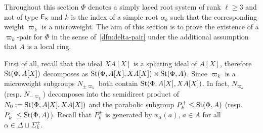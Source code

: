 Throughout this section $\Phi$ denotes a simply laced root system of rank $\ell \geq 3$ and not of type $\mathsf{E}_8$ and $k$ is the index of
 a simple root $\alpha_k$ such that the corresponding weight $\varpi_k$ is a microweight.
The aim of this section is to prove the existence of a $\varpi_k$-pair for $\Phi$ in the sense of~\cref{dfn:delta-pair}
 under the additional assumption that $A$ is a local ring.

First of all, recall that the ideal $XA[X]$ is a splitting ideal of $A[X]$, therefore
$\operatorname{St}(\Phi, A[X])$ decomposes as $\operatorname{St}(\Phi, A[X], XA[X]) \rtimes \operatorname{St}(\Phi, A)$.
Since $\varpi_k$ is a microweight subgroups $N_{\pm \varpi_k}$ both contain $\operatorname{St}(\Phi, A[X], XA[X])$.
In fact, $N_{\varpi_k}$ (resp. $N_{-\varpi_k}$) decomposes into the semidirect product of $N_0 := \operatorname{St}(\Phi, A[X], XA[X])$ and the parabolic subgroup $P_k^+ \leq \operatorname{St}(\Phi, A)$ (resp. $P_k^-\leq \operatorname{St}(\Phi, A)$).
Recall that $P_k^\pm$ is generated by $x_\alpha(a)$, $a \in A$ for all $\alpha \in \Delta \sqcup \Sigma^\pm_k$.

